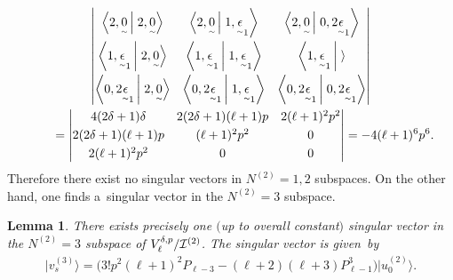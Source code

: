 \documentclass[11pt]{article}
\numberwithin{equation}{section}
\newcommand{\underaccent}[2]{\mathord{\underset{\smash{\scriptscriptstyle\sim}}{#2}}}
\newtheorem{lemma}{Lemma}
\def\bracket#1#2{\left\langle #1  \,\right| \left. #2 \right\rangle}
\begin{document}
\begin{gather*}
    \left|
\begin{matrix} \bracket{2,\underaccent{\tilde}{0}}{2,\underaccent{\tilde}{0}} &
\bracket{2,\underaccent{\tilde}{0}}{1,\underaccent{\tilde}{\epsilon}_1} &
\bracket{2,\underaccent{\tilde}{0}}{0,2\underaccent{\tilde}{\epsilon}_1}
\vspace{1mm}\\ \bracket{1,\underaccent{\tilde}{\epsilon}_1}{2,\underaccent{\tilde}{0}} &
\bracket{1,\underaccent{\tilde}{\epsilon}_1}{1,\underaccent{\tilde}{\epsilon}_1} &
\bracket{1,\underaccent{\tilde}{\epsilon}_1}{}
\vspace{1mm}\\ \bracket{0,2\underaccent{\tilde}{\epsilon}_1}{2,\underaccent{\tilde}{0}} &
\bracket{0,2\underaccent{\tilde}{\epsilon}_1}{1,\underaccent{\tilde}{\epsilon}_1} &
\bracket{0,2\underaccent{\tilde}{\epsilon}_1}{0,2\underaccent{\tilde}{\epsilon}_1}
\end{matrix}
\right|
\\
\qquad{}
= \left|
\begin{matrix} 4(2\delta+1) \delta & 2(2\delta+1)(\ell+1)p & 2(\ell+1)^2 p^2
\vspace{1mm}\\ 2(2\delta+1)(\ell+1)p & (\ell+1)^2 p^2 & 0
\vspace{1mm}\\ 2(\ell+1)^2 p^2 & 0 & 0
\end{matrix}
\right| = -4(\ell+1)^6 p^6.
\end{gather*}
Therefore there exist no singular vectors in $ N^{(2)} = 1, 2 $ subspaces.
On the other hand, one f\/inds a~singular vector in the $ N^{(2)} = 3 $ subspace.

\begin{lemma}
\label{lemma4}
There exists precisely one $($up to overall constant$)$ singular vector in the $ N^{(2)} = 3 $ subspace of $
V^{\delta,p}_{\ell}/{\cal I}^{(2)}$.
The singular vector is given~by
\begin{gather*}
\big|v_s^{(3)}\big\rangle  = \big(3! p^2 (\ell+1)^2  P_{\ell-3} - (\ell+2)  (\ell+3)  P_{\ell-1}^3\big) \big|u_0^{(2)}\big\rangle .
\end{gather*}
\end{lemma}
\end{document}
